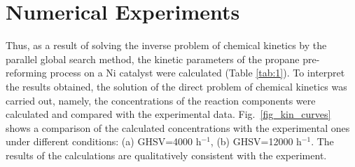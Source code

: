 \documentclass{svproc}
\begin{document}
\section{Numerical Experiments}\label{Sec_Exp}
Thus, as a result of solving the inverse problem of chemical kinetics by the parallel global search method, the kinetic parameters of the propane pre-reforming process on a Ni catalyst were calculated (Table \ref{tab:1}). To interpret the results obtained, the solution of the direct problem of chemical kinetics was carried out, namely, the concentrations of the reaction components were calculated and compared with the experimental data. Fig.~\ref{fig_kin_curves} shows a comparison of the calculated concentrations with the experimental ones under different conditions: (a) GHSV=4000 h$^{-1}$, (b) GHSV=12000 h$^{-1}$. The results of the calculations are qualitatively consistent with the experiment.
\end{document}
